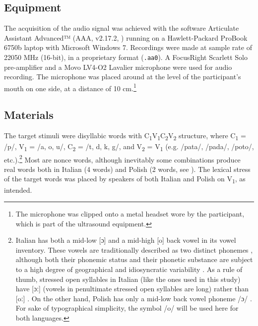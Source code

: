 \documentclass[preprint]{JASAnew}
\begin{document}
\hypertarget{equipment}{%
\subsection{Equipment}\label{equipment}}

The acquisition of the audio signal was achieved with the software
Articulate Assistant Advanced™ (AAA, v2.17.2, \citealt{articulate2011})
running on a Hawlett-Packard ProBook 6750b laptop with Microsoft Windows
7. Recordings were made at sample rate of 22050 MHz (16-bit), in a
proprietary format (\texttt{.aa0}). A FocusRight Scarlett Solo
pre-amplifier and a Movo LV4-O2 Lavalier microphone were used for audio
recording. The microphone was placed around at the level of the
participant's mouth on one side, at a distance of 10
cm.\footnote{The microphone was clipped onto a metal headset wore by the participant, which is part of the ultrasound equipment.}

\hypertarget{materials}{%
\subsection{Materials}\label{materials}}

\label{s:materials}

The target stimuli were disyllabic words with
C\textsubscript{1}V\textsubscript{1}C\textsubscript{2}V\textsubscript{2}
structure, where C\textsubscript{1} = /p/, V\textsubscript{1} = /a, o,
u/, C\textsubscript{2} = /t, d, k, g/, and V\textsubscript{2} =
V\textsubscript{1} (e.g. /pata/, /pada/, /poto/,
etc.).\footnote{Italian has both a mid-low [ɔ] and a mid-high [o] back vowel in its vowel inventory. These vowels are traditionally described as two distinct phonemes \citep{kramer2009}, although both their phonemic status and their phonetic substance are subject to a high degree of geographical and idiosyncratic variability \citet{renwick2016}. As a rule of thumb, stressed open syllables in Italian (like the ones used in this study) have [ɔː] (vowels in penultimate stressed open syllables are long) rather than [oː] \citet{renwick2016}. On the other hand, Polish has only a mid-low back vowel phoneme /ɔ/ \citep{gussmann2007}. For sake of typographical simplicity, the symbol /o/ will be used here for both languages.}
Most are nonce words, although inevitably some combinations produce real
words both in Italian (4 words) and Polish (2 words, see
). The lexical stress of the target words was placed by
speakers of both Italian and Polish on V\textsubscript{1}, as intended.
\end{document}
